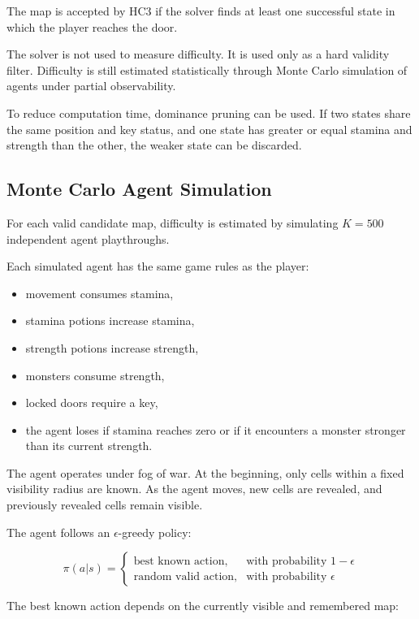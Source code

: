\documentclass[11pt]{article}
\begin{document}
The map is accepted by HC3 if the solver finds at least one successful state in which the player reaches the door.

The solver is not used to measure difficulty. It is used only as a hard validity filter. Difficulty is still estimated statistically through Monte Carlo simulation of agents under partial observability.

To reduce computation time, dominance pruning can be used. If two states share the same position and key status, and one state has greater or equal stamina and strength than the other, the weaker state can be discarded.

\subsection{Monte Carlo Agent Simulation}

For each valid candidate map, difficulty is estimated by simulating $K = 500$ independent agent playthroughs.

Each simulated agent has the same game rules as the player:

\begin{itemize}[noitemsep]
    \item movement consumes stamina,
    \item stamina potions increase stamina,
    \item strength potions increase strength,
    \item monsters consume strength,
    \item locked doors require a key,
    \item the agent loses if stamina reaches zero or if it encounters a monster stronger than its current strength.
\end{itemize}

The agent operates under fog of war. At the beginning, only cells within a fixed visibility radius are known. As the agent moves, new cells are revealed, and previously revealed cells remain visible.

The agent follows an $\epsilon$-greedy policy:

\[
\pi(a|s) =
\begin{cases}
\text{best known action}, & \text{with probability } 1-\epsilon \\
\text{random valid action}, & \text{with probability } \epsilon
\end{cases}
\]

The best known action depends on the currently visible and remembered map:
\end{document}
